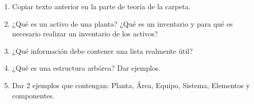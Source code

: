 \begin{enumerate}
    \item Copiar texto anterior en la parte de teoría de la carpeta.
    \item ¿Qué es un activo de una planta? ¿Qué es un inventario y para qué es necesario realizar un inventario de los activos?
    \item ¿Qué información debe contener una lista realmente útil?
    \item ¿Qué es una estructura arbórea? Dar ejemplos.
    \item Dar 2 ejemplos que contengan: Planta, Área, Equipo, Sistema, Elementos y componentes.
    
\end{enumerate}
